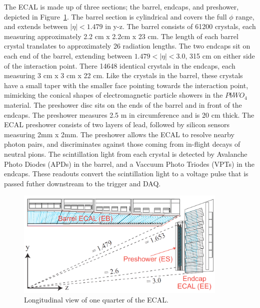 The ECAL is made up of three sections; the barrel, endcaps, and preshower, depicted in Figure~\ref{fig:cms_ecal}. The barrel section is cylindrical and covers the full $\phi$
range, and extends between $|\eta| < 1.479$ in y-z. The barrel consists of 61200 crystals, each measuring approximately 2.2 cm x 2.2cm x 23 cm. The length of each barrel
crystal translates to approximately 26 radiation lengths. The two endcaps sit on each end of the barrel, extending between $1.479 < |\eta|< 3.0$, 315 cm on either side of
the interaction point. There 14648 identical crystals in the endcaps, each measuring 3 cm x 3 cm x 22 cm. Like the crystals in the barrel, these crystals have a small taper
with the smaller face pointing towards the interaction point, mimicking the conical shapes of electromagnetic particle showers in the $PbWO_{4}$ material.
The preshower disc sits on the ends of the barrel and in front of the endcaps. The preshower measures 2.5 m in circumference and is 20 cm thick. The ECAL preshower consists of two layers
of lead, followed by silicon sensors measuring 2mm x 2mm. The preshower allows the ECAL to resolve nearby photon pairs, and discriminates against those coming from in-flight decays
of neutral pions. The scintillation light from each crystal is detected by Avalanche Photo Diodes (APDs) in the barrel, and a Vaccuum Photo Triodes (VPTs) in the endcaps.
These readouts convert the scintillation light to a voltage pulse that is passed futher downstream to the trigger and DAQ. 

\begin{figure}[hbtp]
 \begin{center}
   \includegraphics[width=0.9\textwidth]{ch3_figs/ecal_rapidity.pdf}
   \caption[Longitudinal view of the CMS ECAL]{Longitudinal view of one quarter of the ECAL.}
   \label{fig:cms_ecal}
 \end{center}
\end{figure}

